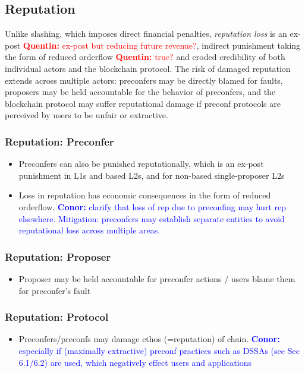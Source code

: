 \documentclass[a4paper]{article}
\theoremstyle{boldstyle}
\newcommand{\cm}[1]{\textcolor{blue}{\textbf{Conor:} #1}}
\newcommand{\qb}[1]{\textcolor{red}{\textbf{Quentin:} #1}}
\begin{document}
\subsection{Reputation}
    Unlike slashing, which imposes direct financial penalties, \emph{reputation loss} is an ex-post \qb{ex-post but reducing future revenue?}, indirect punishment taking the form of reduced orderflow \qb{true?} and eroded credibility of both individual actors and the blockchain protocol. 
    The risk of damaged reputation extends across multiple actors: preconfers may be directly blamed for faults, proposers may be held accountable for the behavior of preconfers, and the blockchain protocol may suffer reputational damage if preconf protocols are perceived by users to be unfair or extractive.
    
    \subsubsection{Reputation: Preconfer}
        \begin{itemize}
            \item Preconfers can also be punished reputationally, which is an ex-post punishment in L1s and based L2s, and for non-based single-proposer L2s 
            \item Loss in reputation has economic consequences in the form of reduced orderflow. \cm{clarify that loss of rep due to preconfing may hurt rep elsewhere. Mitigation: preconfers may establish separate entities to avoid reputational loss across multiple areas.} 
        \end{itemize}

    \subsubsection{Reputation: Proposer}
        \begin{itemize}
            \item Proposer may be held accountable for preconfer actions / users blame them for preconfer's fault
        \end{itemize}

    \subsubsection{Reputation: Protocol}
        \begin{itemize}
            \item Preconfers/preconfs may damage ethos (=reputation) of chain. \cm{especially if (maximally extractive) preconf practices such as DSSAs (see Sec 6.1/6.2) are used, which negatively effect users and applications}
        \end{itemize}
\end{document}
